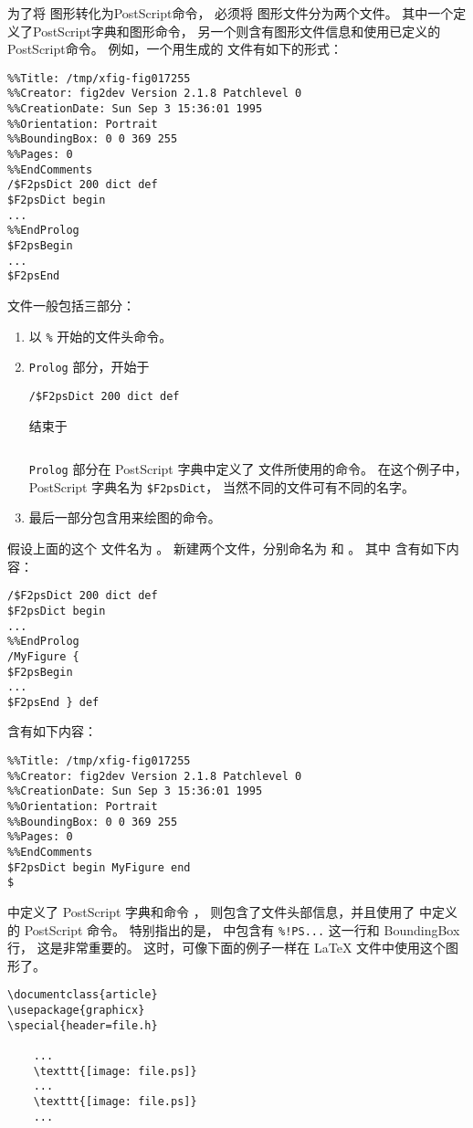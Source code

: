 为了将  图形转化为PostScript命令，
必须将  图形文件分为两个文件。
其中一个定义了PostScript字典和图形命令，
另一个则含有图形文件信息和使用已定义的PostScript命令。
例如，一个用生成的  文件有如下的形式：
\begin{Verbatim}[xleftmargin=1cm]
%!PS-Adobe-2.0 EPSF-2.0
%%Title: /tmp/xfig-fig017255
%%Creator: fig2dev Version 2.1.8 Patchlevel 0
%%CreationDate: Sun Sep 3 15:36:01 1995
%%Orientation: Portrait
%%BoundingBox: 0 0 369 255
%%Pages: 0
%%EndComments
/$F2psDict 200 dict def
$F2psDict begin
...
%%EndProlog
$F2psBegin
...
$F2psEnd
\end{Verbatim}
 文件一般包括三部分：
\begin{enumerate}
	\item 以 \texttt{\%} 开始的文件头命令。
	\item \texttt{Prolog} 部分，开始于
\begin{Verbatim}[xleftmargin=1cm]
/$F2psDict 200 dict def
\end{Verbatim}
      结束于
\begin{Verbatim}[xleftmargin=1cm]
%%EndProlog
\end{Verbatim}
	\texttt{Prolog} 部分在 PostScript 字典中定义了  文件所使用的命令。
    在这个例子中，PostScript 字典名为 \verb|$F2psDict|，
    当然不同的文件可有不同的名字。
	\item 最后一部分包含用来绘图的命令。
\end{enumerate}

假设上面的这个  文件名为 。
新建两个文件，分别命名为  和 。
其中  含有如下内容：
\begin{Verbatim}[xleftmargin=1cm]
/$F2psDict 200 dict def
$F2psDict begin
...
%%EndProlog
/MyFigure {
$F2psBegin
...
$F2psEnd } def
\end{Verbatim}
 含有如下内容：
\begin{Verbatim}[xleftmargin=1cm]
%!PS-Adobe-2.0 EPSF-2.0
%%Title: /tmp/xfig-fig017255
%%Creator: fig2dev Version 2.1.8 Patchlevel 0
%%CreationDate: Sun Sep 3 15:36:01 1995
%%Orientation: Portrait
%%BoundingBox: 0 0 369 255
%%Pages: 0
%%EndComments
$F2psDict begin MyFigure end
$
\end{Verbatim}

 中定义了 PostScript 字典和命令 ，
 则包含了文件头部信息，并且使用了  中定义的 PostScript 命令。
特别指出的是， 中包含有 \verb|%!PS...| 这一行和 BoundingBox 行，
这是非常重要的。
这时，可像下面的例子一样在 \LaTeX{} 文件中使用这个图形了。
\begin{lstlisting}
\documentclass{article}
\usepackage{graphicx}
\special{header=file.h}

	...
	\texttt{[image: file.ps]}
	...
	\texttt{[image: file.ps]}
	...

\end{lstlisting}

